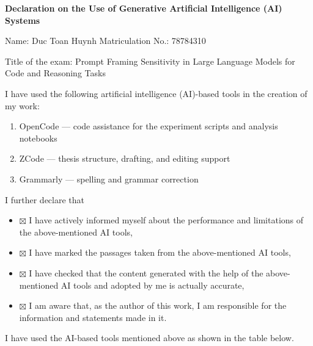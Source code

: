 {\small

\vspace*{0.3cm}

\textbf{\large Declaration on the Use of Generative Artificial Intelligence (AI) Systems}

\vspace{0.2cm}

\noindent
Name: Duc Toan Huynh \hfill Matriculation No.: 78784310

\vspace{0.1cm}
\noindent
Title of the exam: Prompt Framing Sensitivity in Large Language Models for Code and Reasoning Tasks

\vspace{0.2cm}

\noindent
I have used the following artificial intelligence (AI)-based tools in the creation of my work:

\begin{enumerate}\setlength{\itemsep}{0pt}\setlength{\topsep}{0pt}
\item OpenCode --- code assistance for the experiment scripts and analysis notebooks
\item ZCode --- thesis structure, drafting, and editing support
\item Grammarly --- spelling and grammar correction
\end{enumerate}

\vspace{0.15cm}

\noindent
I further declare that

\begin{itemize}\setlength{\itemsep}{0pt}\setlength{\topsep}{0pt}
\item $\boxtimes$ I have actively informed myself about the performance and limitations of the above-mentioned AI tools,
\item $\boxtimes$ I have marked the passages taken from the above-mentioned AI tools,
\item $\boxtimes$ I have checked that the content generated with the help of the above-mentioned AI tools and adopted by me is actually accurate,
\item $\boxtimes$ I am aware that, as the author of this work, I am responsible for the information and statements made in it.
\end{itemize}

\vspace{0.1cm}

\noindent
I have used the AI-based tools mentioned above as shown in the table below.

}
